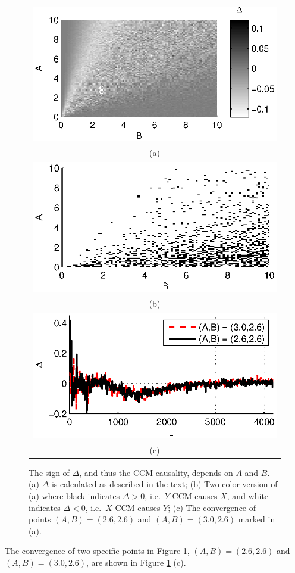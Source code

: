 \documentclass[twocolumn,aps,pre,groupedaddress]{revtex4-1}
\begin{document}
\begin{figure}[ht]
\begin{tabular}{c}
\includegraphics[scale=0.9]{LinearEx.eps} \\
(a) \\
\includegraphics[scale=0.9]{LinearEx3Color.eps} \\
(b) \\
\includegraphics[scale=0.9]{LinearExChangeL.eps} \\
(c) \\
\end{tabular}
\caption{The sign of $\Delta$, and thus the CCM causality, depends on $A$ and $B$. (a) $\Delta$ is calculated as described in the text; (b) Two color version of (a) where black indicates $\Delta>0$, i.e.\ $Y$ CCM causes $X$, and white indicates $\Delta<0$, i.e.\ $X$ CCM causes $Y$; (c) The convergence of points $(A,B) = (2.6,2.6)$ and $(A,B)=(3.0,2.6)$ marked in (a).}
\label{fig:linearex1}
\end{figure}
The convergence of two specific points in Figure \ref{fig:linearex1}, $(A,B) = (2.6,2.6)$ and $(A,B)=(3.0,2.6)$, are shown in Figure \ref{fig:linearex1} (c).
\end{document}
